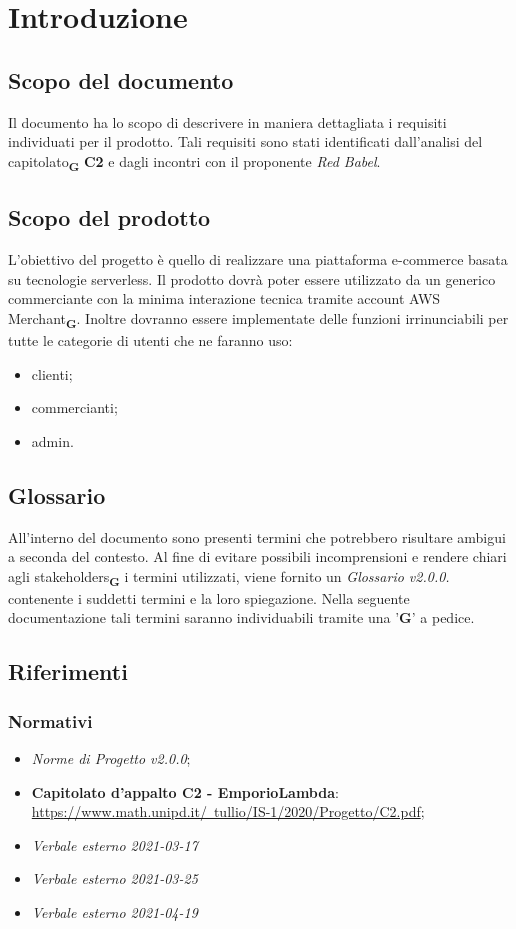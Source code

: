 \section{Introduzione}
\subsection{Scopo del documento}
Il documento ha lo scopo di descrivere in maniera dettagliata i requisiti individuati per il prodotto. Tali requisiti sono stati identificati dall'analisi del capitolato\textsubscript{\textbf{G}} \textbf{C2} e dagli incontri con il proponente \textit{Red Babel}.
\subsection{Scopo del prodotto}
L'obiettivo del progetto è quello di realizzare una piattaforma e-commerce basata su tecnologie serverless. Il prodotto dovrà poter essere utilizzato da un generico commerciante con la minima interazione tecnica tramite account AWS Merchant\textsubscript{\textbf{G}}. Inoltre dovranno essere implementate delle funzioni irrinunciabili per tutte le categorie di utenti che ne faranno uso:
\begin{itemize}
    \item clienti;
    \item commercianti;
    \item admin.
\end{itemize}
\subsection{Glossario}
All'interno del documento sono presenti termini che potrebbero risultare ambigui a seconda del contesto. Al fine di evitare possibili incomprensioni
e rendere chiari agli stakeholders\textsubscript{\textbf{G}} i termini utilizzati, viene fornito un \textit{Glossario v2.0.0.} contenente i suddetti termini
e la loro spiegazione. Nella seguente documentazione tali termini saranno individuabili tramite una '\textbf{G}' a pedice.
\subsection{Riferimenti}
\subsubsection{Normativi}
\begin{itemize}
    \item \textit{Norme di Progetto v2.0.0};
    \item \textbf{Capitolato d'appalto C2 - EmporioLambda}:\\ \href{https://www.math.unipd.it/~tullio/IS-1/2020/Progetto/C2.pdf}{https://www.math.unipd.it/~tullio/IS-1/2020/Progetto/C2.pdf};
    \item \textit{Verbale esterno 2021-03-17}
    \item \textit{Verbale esterno 2021-03-25}
    \item \textit{Verbale esterno 2021-04-19}
\end{itemize}
